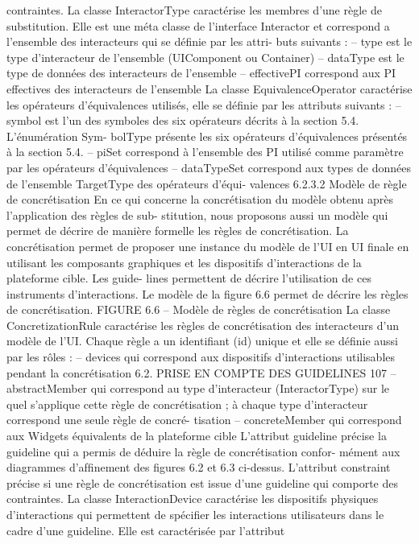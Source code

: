 \documentclass{article}
\begin{document}
contraintes.
La classe InteractorType
caractérise les membres d’une règle de substitution. Elle est une méta
classe de l’interface Interactor et correspond a l’ensemble des interacteurs qui se déﬁnie par les attri-
buts suivants :
– type est le type d’interacteur de l’ensemble (UIComponent ou Container)
– dataType est le type de données des interacteurs de l’ensemble
– effectivePI correspond aux PI effectives des interacteurs de l’ensemble
La classe EquivalenceOperator
caractérise les opérateurs d’équivalences utilisés, elle se déﬁnie
par les attributs suivants :
– symbol est l’un des symboles des six opérateurs décrits à la section 5.4. L’énumération Sym-
bolType présente les six opérateurs d’équivalences présentés à la section 5.4.
– piSet correspond à l’ensemble des PI utilisé comme paramètre par les opérateurs d’équivalences
– dataTypeSet correspond aux types de données de l’ensemble TargetType des opérateurs d’équi-
valences
6.2.3.2
Modèle de règle de concrétisation
En ce qui concerne la concrétisation du modèle obtenu après l’application des règles de sub-
stitution, nous proposons aussi un modèle qui permet de décrire de manière formelle les règles de
concrétisation. La concrétisation permet de proposer une instance du modèle de l’UI en UI ﬁnale en
utilisant les composants graphiques et les dispositifs d’interactions de la plateforme cible. Les guide-
lines permettent de décrire l’utilisation de ces instruments d’interactions. Le modèle de la ﬁgure 6.6
permet de décrire les règles de concrétisation.
FIGURE 6.6 – Modèle de règles de concrétisation
La classe ConcretizationRule
caractérise les règles de concrétisation des interacteurs d’un modèle
de l’UI. Chaque règle a un identiﬁant (id) unique et elle se déﬁnie aussi par les rôles :
– devices qui correspond aux dispositifs d’interactions utilisables pendant la concrétisation
6.2. PRISE EN COMPTE DES GUIDELINES
107
– abstractMember qui correspond au type d’interacteur (InteractorType) sur le quel s’applique
cette règle de concrétisation ; à chaque type d’interacteur correspond une seule règle de concré-
tisation
– concreteMember qui correspond aux Widgets équivalents de la plateforme cible
L’attribut guideline précise la guideline qui a permis de déduire la règle de concrétisation confor-
mément aux diagrammes d’afﬁnement des ﬁgures 6.2 et 6.3 ci-dessus.
L’attribut constraint précise si une règle de concrétisation est issue d’une guideline qui comporte
des contraintes.
La classe InteractionDevice
caractérise les dispositifs physiques d’interactions qui permettent de
spéciﬁer les interactions utilisateurs dans le cadre d’une guideline. Elle est caractérisée par l’attribut
\end{document}

